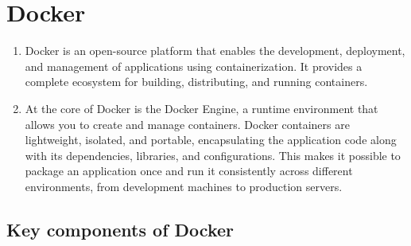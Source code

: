\section*{Docker}

\begin{enumerate}
    \item Docker is an open-source platform that enables the development, deployment, and management of applications using containerization. It provides a complete ecosystem for building, distributing, and running containers.

    \item At the core of Docker is the Docker Engine, a runtime environment that allows you to create and manage containers. Docker containers are lightweight, isolated, and portable, encapsulating the application code along with its dependencies, libraries, and configurations. This makes it possible to package an application once and run it consistently across different environments, from development machines to production servers.

\end{enumerate}

\subsection*{Key components of Docker}

